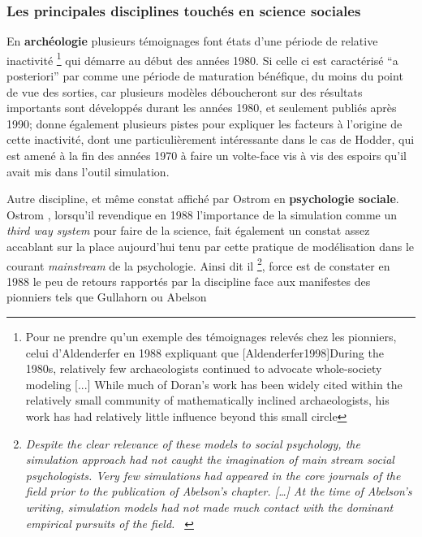 \subsubsection{Les principales disciplines touchés en science sociales}

En \textbf{archéologie} plusieurs témoignages \autocite[6-7]{Lake2013} font états d'une période de relative inactivité \footnote{Pour ne prendre qu'un exemple des témoignages relevés chez les pionniers, celui d'Aldenderfer en 1988 expliquant que [Aldenderfer1998]{During the 1980s, relatively few archaeologists continued to advocate whole-society modeling [...] While much of Doran's work has been widely cited within the relatively small community of mathematically inclined archaeologists, his work has had relatively little influence beyond this small circle}} qui démarre au début des années 1980. Si celle ci est caractérisé \enquote{a posteriori} par \autocite{Lake2013} comme une période de maturation bénéfique, du moins du point de vue des sorties, car plusieurs modèles déboucheront sur des résultats importants sont développés durant les années 1980, et seulement publiés après 1990; \autocite{Lake2013} donne également plusieurs pistes pour expliquer les facteurs à l'origine de cette inactivité, dont une particulièrement intéressante dans le cas de Hodder, qui est amené à la fin des années 1970 à faire un volte-face vis à vis des espoirs qu'il avait mis dans l'outil simulation.

Autre discipline, et même constat affiché par Ostrom en \textbf{psychologie sociale}. Ostrom \autocite{Ostrom1988}, lorsqu'il revendique en 1988 l'importance de la simulation comme un \textit{third way system} pour faire de la science,  fait également un constat assez accablant sur la place aujourd'hui tenu par cette pratique de modélisation dans le courant \textit{mainstream} de la psychologie. Ainsi dit il \footnote{ \textit{Despite the clear relevance of these models to  social psychology, the simulation approach had not caught the imagination of main stream social psychologists. Very few simulations had appeared in the core journals of the field prior to the publication of Abelson's chapter. […] At the time of Abelson's writing, simulation models had not made much contact with the dominant empirical pursuits of the field. } \autocite[382]{Ostrom1988}}, force est de constater en 1988 le peu de retours rapportés par la discipline face aux manifestes des pionniers tels que Gullahorn \autocite{Gullahorn1965} ou Abelson \autocite{Abelson1968} 

